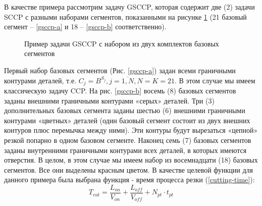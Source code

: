 \documentclass[12pt]{report}
\begin{document}
В качестве примера рассмотрим задачу GSCCP,
которая содержит две (2)
задачи SCCP с разными наборами сегментов,
показанными на рисунке \ref{gsccp-both}
(21 базовый сегмент – \ref{gsccp-a}
и 18 – \ref{gsccp-b} соответственно).

\begin{figure}
  \centering
  \caption{Пример задачи GSCCP с набором из двух комплектов базовых сегментов}
  \label{gsccp-both}
\end{figure}

Первый набор базовых сегментов (Рис. \ref{gsccp-a})
задан всеми граничными контурами деталей, т.е.
$C_j = B^{S_j}, j=\overline{1,N}, N=K=21$.
В этом случае мы имеем классическую задачу CCP.
На рис. \ref{gsccp-b} восемь (8)
базовых сегментов заданы внешними граничными контурами «серых» деталей.
Три (3) дополнительных базовых сегмента заданы шестью (6)
внешними граничными контурами «цветных» деталей
(один базовый сегмент состоит из двух внешних контуров плюс перемычка между ними).
Эти контуры будут вырезаться «цепной» резкой попарно в одном базовом сегменте.
Наконец семь (7) базовых сегментов заданы внутренними
граничными контурами всех деталей,
в которых имеются отверстия.
В целом, в этом случае мы имеем набор из восемнадцати (18)
базовых сегментов.
Все они выделены красным цветом.
В качестве целевой функции для данного примера была выбрана функция - время процесса резки (\ref{cutting-time}):
$$
T_{cut} = \frac{L_{on}}{V_{on}} + \frac{L_{off}}{V_{off}} +N_{pt} \cdot t_{pt}
$$
\end{document}
